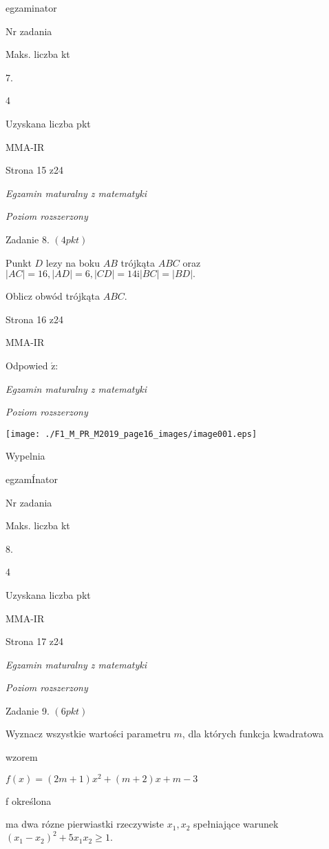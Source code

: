 \documentclass[a4paper,12pt]{article}
\begin{document}
egzaminator

Nr zadania

Maks. liczba kt

7.

4

Uzyskana liczba pkt

MMA-IR

Strona 15 z24





{\it Egzamin maturalny z matematyki}

{\it Poziom rozszerzony}

Zadanie 8. $(4pkt)$

Punkt $D$ lezy na boku $AB$ trójkąta $ABC$ oraz $|AC|=16, |AD|=6, |CD|=14 \mathrm{i} |BC|=|BD|.$

Oblicz obwód trójkąta $ABC.$

Strona 16 z24

MMA-IR





Odpowied $\acute{\mathrm{z}}$:

{\it Egzamin maturalny z matematyki}

{\it Poziom rozszerzony}
\begin{center}
\texttt{[image: ./F1\_M\_PR\_M2019\_page16\_images/image001.eps]}
\end{center}
Wypelnia

egzamÍnator

Nr zadania

Maks. liczba kt

8.

4

Uzyskana liczba pkt

MMA-IR

Strona 17 z24





{\it Egzamin maturalny z matematyki}

{\it Poziom rozszerzony}

Zadanie 9. $(6pkt)$

Wyznacz wszystkie wartości parametru $m$, dla których funkcja kwadratowa

wzorem

$f(x)=(2m+1)x^{2}+(m+2)x+m-3$

f określona

ma dwa rózne pierwiastki rzeczywiste $x_{1}, x_{2}$ spełniające warunek $(x_{1}-x_{2})^{2}+5x_{1}x_{2}\geq 1.$
\end{document}
